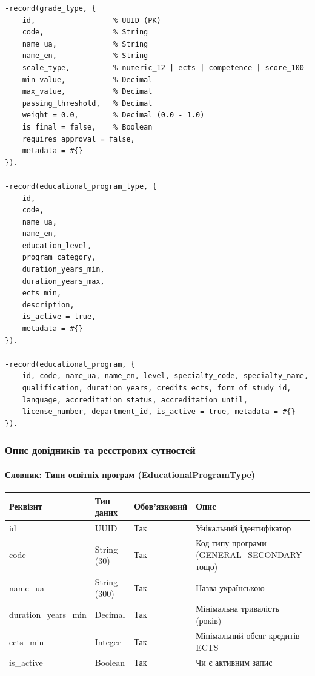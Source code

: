 \documentclass{article}
\begin{document}
\begin{verbatim}
-record(grade_type, {
    id,                  % UUID (PK)
    code,                % String
    name_ua,             % String
    name_en,             % String
    scale_type,          % numeric_12 | ects | competence | score_100
    min_value,           % Decimal
    max_value,           % Decimal
    passing_threshold,   % Decimal
    weight = 0.0,        % Decimal (0.0 - 1.0)
    is_final = false,    % Boolean
    requires_approval = false,
    metadata = #{}
}).

-record(educational_program_type, {
    id,
    code,
    name_ua,
    name_en,
    education_level,
    program_category,
    duration_years_min,
    duration_years_max,
    ects_min,
    description,
    is_active = true,
    metadata = #{}
}).

-record(educational_program, {
    id, code, name_ua, name_en, level, specialty_code, specialty_name,
    qualification, duration_years, credits_ects, form_of_study_id,
    language, accreditation_status, accreditation_until,
    license_number, department_id, is_active = true, metadata = #{}
}).
\end{verbatim}

\subsubsection{Опис довідників та реєстрових сутностей}

\paragraph{Словник: Типи освітніх програм (EducationalProgramType)}
\begin{longtable}{p{3.5cm}p{3cm}p{2cm}p{5.5cm}}
\toprule
\textbf{Реквізит} & \textbf{Тип даних} & \textbf{Обов'язковий} & \textbf{Опис} \\
\midrule
id & UUID & Так & Унікальний ідентифікатор \\
code & String (30) & Так & Код типу програми (GENERAL\_SECONDARY тощо) \\
name\_ua & String (300) & Так & Назва українською \\
duration\_years\_min & Decimal & Так & Мінімальна тривалість (років) \\
ects\_min & Integer & Так & Мінімальний обсяг кредитів ECTS \\
is\_active & Boolean & Так & Чи є активним запис \\
\bottomrule
\end{longtable}
\end{document}
